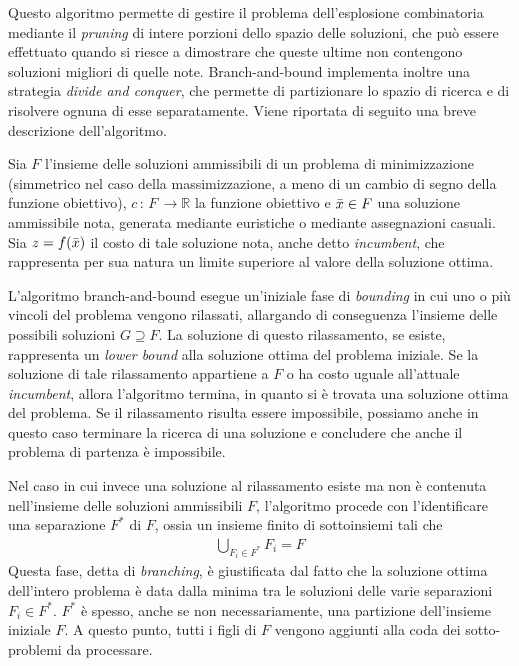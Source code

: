 Questo algoritmo permette di gestire il problema dell'esplosione combinatoria mediante il \textit{pruning} di intere porzioni dello spazio delle soluzioni, che può essere effettuato quando si riesce a dimostrare che queste ultime non contengono soluzioni migliori di 
quelle note. Branch-and-bound implementa inoltre una strategia \textit{divide and conquer}, che permette di partizionare lo spazio di 
ricerca e di risolvere ognuna di esse separatamente. Viene riportata di seguito una breve descrizione dell'algoritmo.

Sia $F$ l'insieme delle soluzioni ammissibili di un problema di minimizzazione (simmetrico nel caso della massimizzazione, a meno di un 
cambio di segno della funzione obiettivo), $c \, : \, F \, \rightarrow \mathbb{R} $ la funzione obiettivo e $\Bar{x} \in F$ una 
soluzione ammissibile nota, generata mediante euristiche o mediante assegnazioni casuali. Sia $z=f(\Bar{x})$ il costo di tale soluzione
nota, anche detto \textit{incumbent}, che rappresenta per sua natura un limite superiore al valore della soluzione ottima. 

L'algoritmo branch-and-bound esegue un'iniziale fase di \textit{bounding} in cui uno o più vincoli del problema vengono rilassati, allargando di conseguenza l'insieme delle possibili soluzioni $G \supseteq F$. La soluzione di questo rilassamento, se esiste,
rappresenta un \textit{lower bound} alla soluzione ottima del problema iniziale. Se la soluzione di tale rilassamento appartiene a $F$
o ha costo uguale all'attuale \textit{incumbent}, allora l'algoritmo termina, in quanto si è trovata una soluzione ottima del problema.
Se il rilassamento risulta essere impossibile, possiamo anche in questo caso terminare la ricerca di una soluzione e 
concludere che anche il problema di partenza è impossibile.

Nel caso in cui invece una soluzione al rilassamento esiste ma non è contenuta nell'insieme delle soluzioni ammissibili $F$,
l'algoritmo procede con l'identificare una separazione $F^*$ di $F$, ossia un insieme finito di sottoinsiemi tali che
\begin{align*}
\bigcup_{F_i \in F^*} F_{i} = F
\end{align*}
Questa fase, detta di \textit{branching}, è giustificata dal fatto che la soluzione ottima dell'intero problema è data dalla minima
tra le soluzioni delle varie separazioni $F_i \in F^*$. $F^*$ è spesso, anche se non necessariamente, una partizione dell'insieme 
iniziale $F$. A questo punto, tutti i figli di $F$ vengono aggiunti alla coda dei sotto-problemi da processare.

